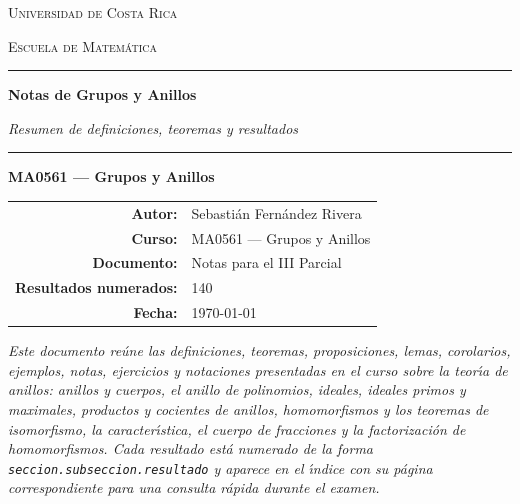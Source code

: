 \documentclass[11pt,twoside]{article}
\newcounter{result}[subsection]
\begin{document}
\begin{titlepage}
\thispagestyle{empty}
\centering

\vspace*{1.5cm}

{\scshape\Large Universidad de Costa Rica\par}
\vspace{0.3cm}
{\scshape\large Escuela de Matem\'atica\par}

\vspace{1.2cm}

{\color{blue!50!black}\rule{\textwidth}{1.2pt}}
\vspace{0.6cm}

{\Huge\bfseries Notas de Grupos y Anillos\par}

\vspace{0.5cm}

{\Large\itshape Resumen de definiciones, teoremas y resultados\par}

\vspace{0.4cm}
{\color{blue!50!black}\rule{\textwidth}{1.2pt}}

\vspace{1.4cm}

{\Large\bfseries MA0561 --- Grupos y Anillos\par}

\vspace{2.2cm}

\begin{tabular}{rl}
\textbf{Autor:}              & Sebasti\'{a}n Fern\'{a}ndez Rivera \\[4pt]
\textbf{Curso:}              & MA0561 --- Grupos y Anillos \\[4pt]
\textbf{Documento:}          & Notas para el III Parcial \\[4pt]
\textbf{Resultados numerados:} & 140 \\[4pt]
\textbf{Fecha:}              & \today
\end{tabular}

\vfill

\begin{minipage}{0.85\textwidth}
\centering
\itshape
Este documento re\'{u}ne las definiciones, teoremas, proposiciones, lemas, corolarios, ejemplos, notas, ejercicios y notaciones presentadas en el curso sobre la teor\'{\i}a de anillos: anillos y cuerpos, el anillo de polinomios, ideales, ideales primos y maximales, productos y cocientes de anillos, homomorfismos y los teoremas de isomorfismo, la caracter\'{\i}stica, el cuerpo de fracciones y la factorizaci\'{o}n de homomorfismos. Cada resultado est\'{a} numerado de la forma \texttt{seccion.subseccion.resultado} y aparece en el \'{\i}ndice con su p\'{a}gina correspondiente para una consulta r\'{a}pida durante el examen.
\end{minipage}


\end{titlepage}
\end{document}
